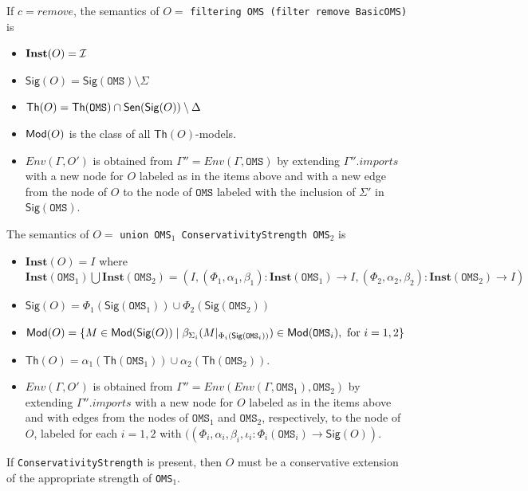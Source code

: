 \documentclass[10pt,fleqn,final]{scrreprt}
\newcommand*{\syntax}[1]{\texttt{#1}}
\newcommand{\Sig}{\mathsf{Sig}}
\renewcommand{\Th}{\mathsf{Th}}
\newcommand{\Inst}{\ensuremath{\mathbf{Inst}}}
\newenvironment{definitions}[0]{\medskip }{}
\begin{document}
\begin{definitions}
\noindent
If $c = remove$, the semantics of $O =$
\syntax{filtering OMS (filter remove BasicOMS)} is
\begin{itemize}
  \item $\Inst(O) = \cI$
  \item $\Sig(O) = \Sig(\syntax{OMS})\setminus \Sigma$ 
  \item $\Th(O) = \Th(\syntax{OMS})\cap\Sen(\Sig(O))\setminus\Delta$
  \item $\mathsf{Mod}(O)$ is the class of all $\Th(O)$-models.
    \item $Env(\Gamma, O')$ is obtained from 
       $\Gamma'' = Env(\Gamma, \syntax{OMS})$
       by extending $\Gamma''.imports$
       with a new node for $O$ labeled as in the items above and
       with a new edge from the node of $O$ to the node of $\syntax{OMS}$
        labeled with the inclusion of $\Sigma'$ in $\Sig(\syntax{OMS})$.
\end{itemize}


The semantics of $O =$
\syntax{union OMS$_1$ ConservativityStrength OMS$_2$} is
\begin{itemize}
  \item $\Inst(O) = I$ where
    $\Inst(\syntax{OMS}_1) \bigcup \Inst(\syntax{OMS}_2) =(I, (\Phi_1, \alpha_1,\beta_1) : \Inst(\syntax{OMS}_1) \rightarrow I, 
                    (\Phi_2, \alpha_2,\beta_2) : \Inst(\syntax{OMS}_2) \rightarrow I)$
  \item $\Sig(O) = \Phi_1(\Sig(\syntax{OMS}_1)) \cup \Phi_2(\Sig(\syntax{OMS}_2))$
  \item $\Mod(O) = \{ M\in \Mod(\Sig(O)) \mid \beta_{\Sigma_i}(M\forget{\Phi_i(\Sig(\syntax{OMS}_i))}) \in \Mod(\syntax{OMS}_i), \text{ for } i=1,2 \}$
  \item $\Th(O) = \alpha_1(\Th(\syntax{OMS}_1)) \cup \alpha_2(\Th(\syntax{OMS}_2))$.
    \item 
        $Env(\Gamma, O')$ is obtained from 
       $\Gamma'' = Env(Env(\Gamma,\syntax{OMS}_1), \syntax{OMS}_2)$
       by extending $\Gamma''.imports$
       with a new node for $O$ labeled as in the items above and
       with edges from the nodes of $\syntax{OMS}_1$ and $\syntax{OMS}_2$,
       respectively, to the node of $O$,
        labeled for each $i=1,2$ with
        $((\Phi_i, \alpha_i,\beta_i, \iota_i: \Phi_i(\syntax{OMS}_i) \to \Sig(O))$.
\end{itemize}

If \syntax{ConservativityStrength} is present, then $O$ must be a conservative extension
of the appropriate strength of \syntax{OMS}$_1$.


\end{definitions}
\end{document}

